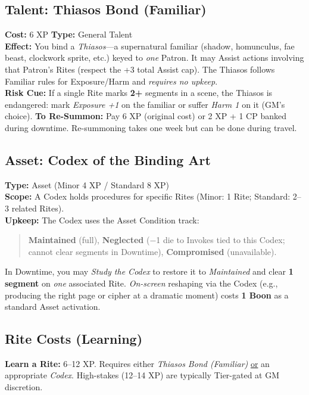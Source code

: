 \documentclass[12pt,twoside]{book}
\begin{document}
\subsection{Talent: Thiasos Bond (Familiar)}
\label{subsec:thiasos-bond}
\textbf{Cost:} 6 XP \hfill \textbf{Type:} General Talent \\
\textbf{Effect:} You bind a \emph{Thiasos}---a supernatural familiar (shadow, homunculus, fae beast, clockwork sprite, etc.) keyed to \emph{one} Patron. It may Assist actions involving that Patron's Rites (respect the +3 total Assist cap). The Thiasos follows Familiar rules for Exposure/Harm and \emph{requires no upkeep}.\\
\textbf{Risk Cue:} If a single Rite marks \textbf{2+} segments in a scene, the Thiasos is endangered: mark \emph{Exposure +1} on the familiar or suffer \emph{Harm 1} on it (GM's choice).
\textbf{To Re-Summon:} Pay 6 XP (original cost) or 2 XP + 1 CP banked during downtime. Re-summoning takes one week but can be done during travel.

\subsection{Asset: Codex of the Binding Art}
\label{subsec:codex-asset}
\textbf{Type:} Asset (Minor 4 XP / Standard 8 XP) \\
\textbf{Scope:} A Codex holds procedures for specific Rites (Minor: 1 Rite; Standard: 2--3 related Rites).\\
\textbf{Upkeep:} The Codex uses the Asset Condition track:
\begin{quote}
\textbf{Maintained} (full), \textbf{Neglected} (−1 die to Invokes tied to this Codex; cannot clear segments in Downtime), \textbf{Compromised} (unavailable).
\end{quote}
In Downtime, you may \emph{Study the Codex} to restore it to \emph{Maintained} and clear \textbf{1 segment} on \emph{one} associated Rite. \emph{On-screen} reshaping via the Codex (e.g., producing the right page or cipher at a dramatic moment) costs \textbf{1 Boon} as a standard Asset activation. \\

\subsection{Rite Costs (Learning)}
\textbf{Learn a Rite:} 6–12 XP. Requires either \emph{Thiasos Bond (Familiar)} \underline{or} an appropriate \emph{Codex}. High-stakes (12–14 XP) are typically Tier-gated at GM discretion.
\end{document}
